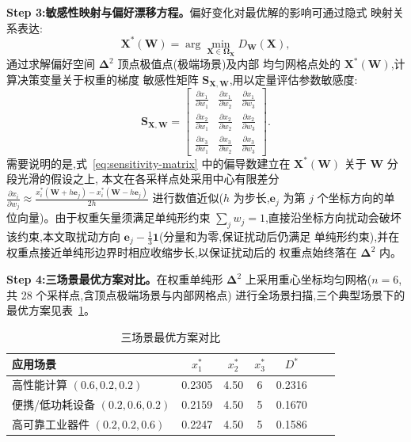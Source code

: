 \textbf{Step 3:敏感性映射与偏好漂移方程。}偏好变化对最优解的影响可通过隐式
映射关系表达:
\begin{equation}
  \mathbf{X}^*(\mathbf{W}) = \arg \min_{\mathbf{X} \in
  \boldsymbol{\Omega}_{\mathbf{X}}} D_{\mathbf{W}}(\mathbf{X}),
  \label{eq:preference-map}
\end{equation}
通过求解偏好空间 $\boldsymbol{\Delta}^2$ 顶点极值点(极端场景)及内部
均匀网格点处的 $\mathbf{X}^*(\mathbf{W})$,计算决策变量关于权重的梯度
敏感性矩阵 $\mathbf{S}_{\mathbf{X},\mathbf{W}}$,用以定量评估参数敏感度:
\begin{equation}
  \mathbf{S}_{\mathbf{X},\mathbf{W}} = \begin{bmatrix}
    \frac{\partial x_1}{\partial w_1} & \frac{\partial x_1}{\partial w_2}
                                      & \frac{\partial x_1}{\partial w_3} \\
    \frac{\partial x_2}{\partial w_1} & \frac{\partial x_2}{\partial w_2}
                                      & \frac{\partial x_2}{\partial w_3} \\
    \frac{\partial x_3}{\partial w_1} & \frac{\partial x_3}{\partial w_2}
                                      & \frac{\partial x_3}{\partial w_3}
  \end{bmatrix}.
  \label{eq:sensitivity-matrix}
\end{equation}
需要说明的是,式~\eqref{eq:sensitivity-matrix} 中的偏导数建立在
$\mathbf{X}^*(\mathbf{W})$ 关于 $\mathbf{W}$ 分段光滑的假设之上,
本文在各采样点处采用中心有限差分
$\frac{\partial x_i}{\partial w_j} \approx
  \frac{x_i^*(\mathbf{W} + h\mathbf{e}_j) - x_i^*(\mathbf{W} -
    h\mathbf{e}_j)}{2h}$ 进行数值近似($h$ 为步长,$\mathbf{e}_j$ 为第
$j$ 个坐标方向的单位向量)。由于权重矢量须满足单纯形约束
$\sum_j w_j = 1$,直接沿坐标方向扰动会破坏该约束,本文取扰动方向
$\mathbf{e}_j - \frac{1}{3}\mathbf{1}$(分量和为零,保证扰动后仍满足
单纯形约束),并在权重点接近单纯形边界时相应收缩步长,以保证扰动后的
权重点始终落在 $\boldsymbol{\Delta}^2$ 内。

\textbf{Step 4:三场景最优方案对比。}在权重单纯形 $\boldsymbol{\Delta}^2$
上采用重心坐标均匀网格($n=6$,共 28 个采样点,含顶点极端场景与内部网格点)
进行全场景扫描,三个典型场景下的最优方案见表~\ref{tab:scenario-results}。

\begin{table}[htbp]
  \centering
  \caption{三场景最优方案对比}
  \label{tab:scenario-results}
  \begin{tabular}{lcccccc}
    \toprule
    应用场景                     & $x_1^*$ & $x_2^*$ & $x_3^*$ & $D^*$  \\
    \midrule
    高性能计算 $(0.6,0.2,0.2)$    & 0.2305  & 4.50    & 6       & 0.2316 \\
    便携/低功耗设备 $(0.2,0.6,0.2)$ & 0.2159  & 4.50    & 5       & 0.1670 \\
    高可靠工业器件 $(0.2,0.2,0.6)$  & 0.2247  & 4.50    & 5       & 0.1586 \\
    \bottomrule
  \end{tabular}
\end{table}

